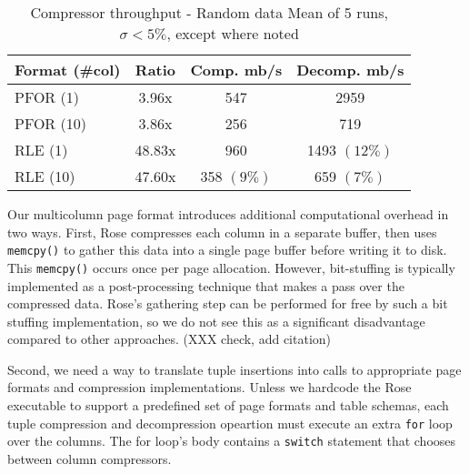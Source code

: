 \documentclass{vldb}
\newcommand{\rows}{Rose\xspace}
\newcommand{\rowss}{Rose's\xspace}
\begin{document}



\begin{table}
\caption{Compressor throughput - Random data Mean of 5 runs, $\sigma<5\%$, except where noted}
\centering
\label{table:perf}
\begin{tabular}{|l|c|c|c|} \hline
Format (\#col)    & Ratio & Comp. mb/s & Decomp. mb/s\\ \hline %
PFOR (1)      &    3.96x  &  547  &    2959 \\ \hline %
PFOR (10)     &    3.86x  &  256 &      719 \\ \hline %
RLE (1)       &   48.83x  &  960  &    1493 $(12\%)$ \\ \hline %
RLE (10)      &   47.60x  &  358 $(9\%)$ & 659 $(7\%)$ \\  %
\hline\end{tabular}
\end{table}


Our multicolumn page format introduces additional computational
overhead in two ways.  First, \rows compresses each column in a
separate buffer, then uses {\tt memcpy()} to gather this data into a
single page buffer before writing it to disk.  This {\tt memcpy()}
occurs once per page allocation.  However, bit-stuffing is typically implemented as a post-processing
technique that makes a pass over the compressed data.  \rowss
gathering step can be performed for free by such a bit stuffing
implementation, so we do not see this as a significant disadvantage
compared to other approaches. (XXX check, add citation)

Second, we need a way to translate tuple insertions into
calls to appropriate page formats and compression implementations.
Unless we hardcode the \rows executable to support a predefined set of
page formats and table schemas, each tuple compression and decompression opeartion must execute an extra {\tt for} loop
over the columns.  The for loop's body contains a {\tt switch} statement that chooses between column compressors.
\end{document}
